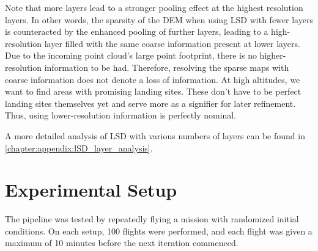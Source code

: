 Note that more layers lead to a stronger pooling effect at the highest resolution layers. In other words, the sparsity of the DEM when using LSD with fewer layers is counteracted by the enhanced pooling of further layers, leading to a high-resolution layer filled with the same coarse information present at lower layers. Due to the incoming point cloud's large point footprint, there is no higher-resolution information to be had. Therefore, resolving the sparse maps with coarse information does not denote a loss of information. At high altitudes, we want to find areas with promising landing sites. These don't have to be perfect landing sites themselves yet and serve more as a signifier for later refinement. Thus, using lower-resolution information is perfectly nominal.

A more detailed analysis of LSD with various numbers of layers can be found in \cref{chapter:appendix:lSD_layer_analysis}.

\section{Experimental Setup}\label{sec:exp_setup}

The pipeline was tested by repeatedly flying a mission with randomized initial conditions. On each setup, 100 flights were performed, and each flight was given a maximum of 10 minutes before the next iteration commenced.

